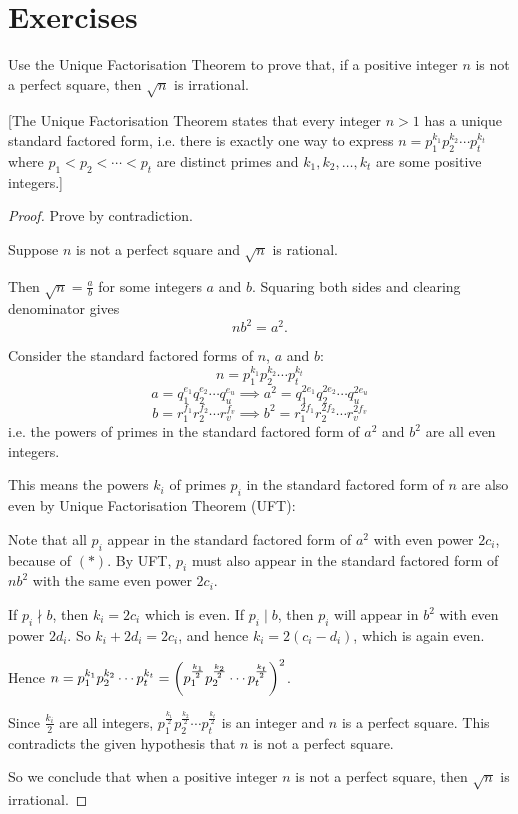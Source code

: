 \section*{Exercises}
\begin{prbm}
Use the Unique Factorisation Theorem to prove that, if a positive integer $n$ is not a perfect square, then $\sqrt{n}$ is irrational.

[The Unique Factorisation Theorem states that every integer $n>1$ has a unique standard factored form, i.e. there is exactly one way to express $n=p_1^{k_1}p_2^{k_2}\cdots p_t^{k_t}$ where $p_1<p_2<\cdots<p_t$ are distinct primes and $k_1,k_2,\dots,k_t$ are some positive integers.]
\end{prbm}

\begin{proof}
Prove by contradiction.

Suppose $n$ is not a perfect square and $\sqrt{n}$ is rational.

Then $\sqrt{n}=\frac{a}{b}$ for some integers $a$ and $b$. Squaring both sides and clearing denominator gives 
\begin{equation*}\tag{$\ast$}
nb^2=a^2.
\end{equation*}

Consider the standard factored forms of $n$, $a$ and $b$:
\[ n=p_1^{k_1}p_2^{k_2}\cdots p_t^{k_t} \]
\[ a=q_1^{e_1}q_2^{e_2}\cdots q_u^{e_u} \implies a^2=q_1^{2e_1}q_2^{2e_2}\cdots q_u^{2e_u} \]
\[ b=r_1^{f_1}r_2^{f_2}\cdots r_v^{f_v} \implies b^2=r_1^{2f_1}r_2^{2f_2}\cdots r_v^{2f_v} \]
i.e. the powers of primes in the standard factored form of $a^2$ and $b^2$ are all even integers. 

This means the powers $k_i$ of primes $p_i$ in the standard factored form of $n$ are also even by Unique Factorisation Theorem (UFT):

Note that all $p_i$ appear in the standard factored form of $a^2$ with even power $2c_i$, because of $(\ast)$. By UFT, $p_i$ must also appear in the standard factored form of $nb^2$ with the same even power $2c_i$.

If $p_i\nmid b$, then $k_i=2c_i$ which is even. If $p_i\mid b$, then $p_i$ will appear in $b^2$ with even power $2d_i$. So $k_i+2d_i=2c_i$, and hence $k_i=2(c_i-d_i)$, which is again even.

Hence $n=p_1^{k_1}p_2^{k_2}\cdots p_t^{k_t}=\left(p_1^{\frac{k_1}{2}}p_2^{\frac{k_2}{2}}\cdots p_t^{\frac{k_t}{2}}\right)^2$.

Since $\frac{k_i}{2}$ are all integers, $p_1^{\frac{k_1}{2}}p_2^{\frac{k_2}{2}}\cdots p_t^{\frac{k_t}{2}}$ is an integer and $n$ is a perfect square. This contradicts the given hypothesis that $n$ is not a perfect square.

So we conclude that when a positive integer $n$ is not a perfect square, then $\sqrt{n}$ is irrational.
\end{proof}

